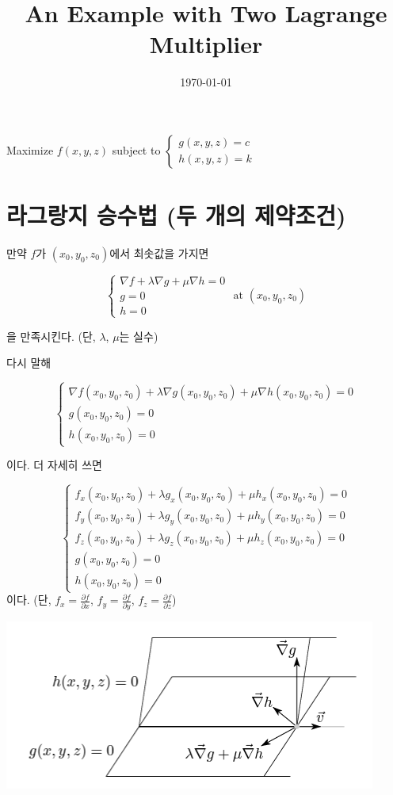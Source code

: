 \documentclass{article}
\title{An Example with Two Lagrange Multiplier}
\author{}
\date{\today}
\begin{document}
\maketitle

\begin{center}
Maximize $f(x,y,z)$ subject to \(\begin{cases}g(x,y,z)=c\\h(x,y,z)=k\end{cases}\)
\end{center}

\tableofcontents

\newpage

\section{라그랑지 승수법 (두 개의 제약조건)}
만약 $f$가 $(x_0, y_0, z_0)$에서 최솟값을 가지면

\[
\begin{cases}
\nabla f+\lambda\nabla g+\mu\nabla h=0\\
g=0\\
h=0
\end{cases}
\text{ at }(x_0,y_0,z_0)
\]

을 만족시킨다. (단, $\lambda$, $\mu$는 실수)

다시 말해

\[
\begin{cases}
\nabla f(x_0,y_0,z_0)+\lambda\nabla g(x_0,y_0,z_0)+\mu\nabla h(x_0,y_0,z_0)=0\\
g(x_0,y_0,z_0)=0\\
h(x_0,y_0,z_0)=0
\end{cases}
\]

이다.
더 자세히 쓰면

\[
\begin{cases}
f_x(x_0,y_0,z_0)+\lambda g_x(x_0,y_0,z_0)+\mu h_x(x_0,y_0,z_0)=0\\
f_y(x_0,y_0,z_0)+\lambda g_y(x_0,y_0,z_0)+\mu h_y(x_0,y_0,z_0)=0\\
f_z(x_0,y_0,z_0)+\lambda g_z(x_0,y_0,z_0)+\mu h_z(x_0,y_0,z_0)=0\\
g(x_0,y_0,z_0)=0\\
h(x_0,y_0,z_0)=0
\end{cases}
\]
이다.
(단, $f_x=\frac{\partial f}{\partial x}$, $f_y=\frac{\partial f}{\partial y}$, $f_z=\frac{\partial f}{\partial z}$)

\begin{center}
\includegraphics[width=.6\textwidth]{figure.png}
\end{center}
\end{document}
